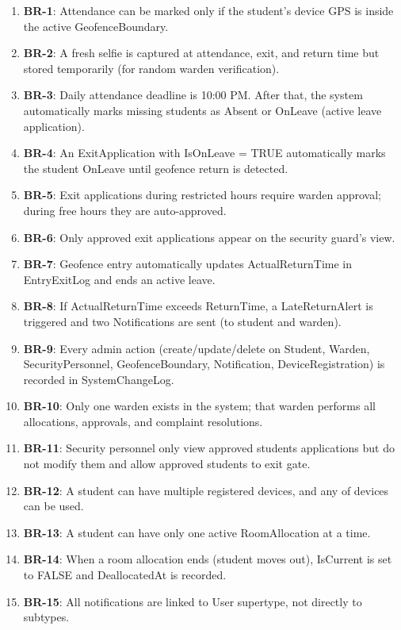 \documentclass[12pt,a4paper]{article}
\begin{document}
\begin{enumerate}
    \item \textbf{BR-1}: Attendance can be marked only if the student's device GPS is inside the active GeofenceBoundary.
    \item \textbf{BR-2}: A fresh selfie is captured at attendance, exit, and return time but stored temporarily (for random warden verification).
    \item \textbf{BR-3}: Daily attendance deadline is 10:00 PM. After that, the system automatically marks missing students as Absent or OnLeave (active leave application).
    \item \textbf{BR-4}: An ExitApplication with IsOnLeave = TRUE automatically marks the student OnLeave until geofence return is detected.
    \item \textbf{BR-5}: Exit applications during restricted hours require warden approval; during free hours they are auto-approved.
    \item \textbf{BR-6}: Only approved exit applications appear on the security guard's view.
    \item \textbf{BR-7}: Geofence entry automatically updates ActualReturnTime in EntryExitLog and ends an active leave.
    \item \textbf{BR-8}: If ActualReturnTime exceeds ReturnTime, a LateReturnAlert is triggered and two Notifications are sent (to student and warden).
    \item \textbf{BR-9}: Every admin action (create/update/delete on Student, Warden, SecurityPersonnel, GeofenceBoundary, Notification, DeviceRegistration) is recorded in SystemChangeLog.
    \item \textbf{BR-10}: Only one warden exists in the system; that warden performs all allocations, approvals, and complaint resolutions.
    \item \textbf{BR-11}: Security personnel only view approved students applications but do not modify them and allow approved students to exit gate.
    \item \textbf{BR-12}: A student can have multiple registered devices, and any of devices can be used.
    \item \textbf{BR-13}: A student can have only one active RoomAllocation at a time.
    \item \textbf{BR-14}: When a room allocation ends (student moves out), IsCurrent is set to FALSE and DeallocatedAt is recorded.
    \item \textbf{BR-15}: All notifications are linked to User supertype, not directly to subtypes.
\end{enumerate}
\end{document}
